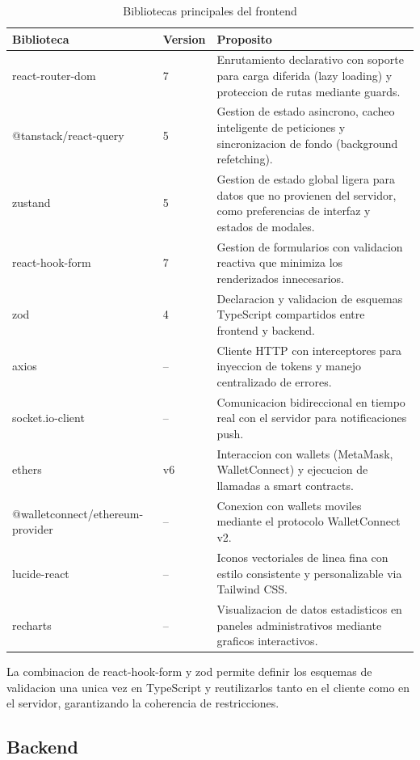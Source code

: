 \documentclass[11pt, a4paper]{article}
\begin{document}
\begin{table}[H]
\centering
\renewcommand{\arraystretch}{1.4}
\small
\begin{tabular}{@{}llp{6.5cm}@{}}
\toprule
\textbf{Biblioteca} & \textbf{Version} & \textbf{Proposito} \\
\midrule
react-router-dom & 7 & Enrutamiento declarativo con soporte para carga diferida (lazy loading) y proteccion de rutas mediante guards. \\
@tanstack/react-query & 5 & Gestion de estado asincrono, cacheo inteligente de peticiones y sincronizacion de fondo (background refetching). \\
zustand & 5 & Gestion de estado global ligera para datos que no provienen del servidor, como preferencias de interfaz y estados de modales. \\
react-hook-form & 7 & Gestion de formularios con validacion reactiva que minimiza los renderizados innecesarios. \\
zod & 4 & Declaracion y validacion de esquemas TypeScript compartidos entre frontend y backend. \\
axios & -- & Cliente HTTP con interceptores para inyeccion de tokens y manejo centralizado de errores. \\
socket.io-client & -- & Comunicacion bidireccional en tiempo real con el servidor para notificaciones push. \\
ethers & v6 & Interaccion con wallets (MetaMask, WalletConnect) y ejecucion de llamadas a smart contracts. \\
@walletconnect/ethereum-provider & -- & Conexion con wallets moviles mediante el protocolo WalletConnect v2. \\
lucide-react & -- & Iconos vectoriales de linea fina con estilo consistente y personalizable via Tailwind CSS. \\
recharts & -- & Visualizacion de datos estadisticos en paneles administrativos mediante graficos interactivos. \\
\bottomrule
\end{tabular}
\caption{Bibliotecas principales del frontend}
\label{tab:lib-frontend}
\end{table}

La combinacion de react-hook-form y zod permite definir los esquemas de validacion una unica vez en TypeScript y reutilizarlos tanto en el cliente como en el servidor, garantizando la coherencia de restricciones.

\subsection{Backend}
\end{document}
